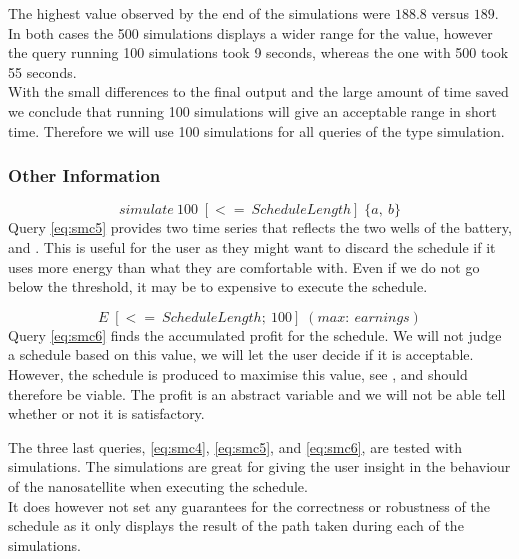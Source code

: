 The highest value observed by the end of the simulations were $188.8$ versus $189$.
In both cases the 500 simulations displays a wider range for the value, however the query running 100 simulations took 9 seconds, whereas the one with 500 took 55 seconds.\\
With the small differences to the final output and the large amount of time saved we conclude that running 100 simulations will give an acceptable range in short time.
Therefore we will use 100 simulations for all queries of the type simulation.

\subsubsection*{Other Information}
\begin{equation} \label{eq:smc5}
	simulate\ 100 \; [<=\ ScheduleLength]\; \{ a,\ b\}
\end{equation}
Query \ref{eq:smc5} provides two time series that reflects the two wells of the battery,  and .
This is useful for the user as they might want to discard the schedule if it uses more energy than what they are comfortable with. Even if we do not go below the threshold, it may be to expensive to execute the schedule.

\begin{equation} \label{eq:smc6}
	E \; [<=\ ScheduleLength;\ 100]\; ( max:\ earnings)
\end{equation}
Query \ref{eq:smc6} finds the accumulated profit for the schedule.
We will not judge a schedule based on this value, we will let the user decide if it is acceptable.
However, the schedule is produced to maximise this value, see , and should therefore be viable.
The profit is an abstract variable and we will not be able tell whether or not it is satisfactory.

The three last queries, \ref{eq:smc4}, \ref{eq:smc5}, and \ref{eq:smc6}, are tested with simulations.
The simulations are great for giving the user insight in the behaviour of the nanosatellite when executing the schedule. \\
It does however not set any guarantees for the correctness or robustness of the schedule as it only displays the result of the path taken during each of the simulations.
